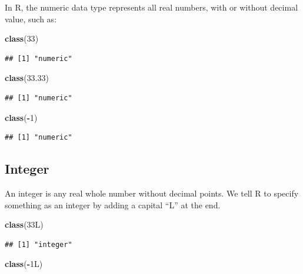 \documentclass[
]{book}
\newenvironment{Shaded}{\begin{snugshade}}{\end{snugshade}}
\newcommand{\DecValTok}[1]{\textcolor[rgb]{0.00,0.00,0.81}{#1}}
\newcommand{\FloatTok}[1]{\textcolor[rgb]{0.00,0.00,0.81}{#1}}
\newcommand{\FunctionTok}[1]{\textcolor[rgb]{0.13,0.29,0.53}{\textbf{#1}}}
\newcommand{\NormalTok}[1]{#1}
\newcommand{\SpecialCharTok}[1]{\textcolor[rgb]{0.81,0.36,0.00}{\textbf{#1}}}
\begin{document}
In R, the numeric data type represents all real numbers, with or without decimal value, such as:

\begin{Shaded}
\begin{Highlighting}[]
\FunctionTok{class}\NormalTok{(}\DecValTok{33}\NormalTok{)}
\end{Highlighting}
\end{Shaded}

\begin{verbatim}
## [1] "numeric"
\end{verbatim}

\begin{Shaded}
\begin{Highlighting}[]
\FunctionTok{class}\NormalTok{(}\FloatTok{33.33}\NormalTok{)}
\end{Highlighting}
\end{Shaded}

\begin{verbatim}
## [1] "numeric"
\end{verbatim}

\begin{Shaded}
\begin{Highlighting}[]
\FunctionTok{class}\NormalTok{(}\SpecialCharTok{{-}}\DecValTok{1}\NormalTok{)}
\end{Highlighting}
\end{Shaded}

\begin{verbatim}
## [1] "numeric"
\end{verbatim}

\hypertarget{integer}{%
\subsection{Integer}\label{integer}}

An integer is any real whole number without decimal points. We tell R to specify something as an integer by adding a capital ``L'' at the end.

\begin{Shaded}
\begin{Highlighting}[]
\FunctionTok{class}\NormalTok{(33L)}
\end{Highlighting}
\end{Shaded}

\begin{verbatim}
## [1] "integer"
\end{verbatim}

\begin{Shaded}
\begin{Highlighting}[]
\FunctionTok{class}\NormalTok{(}\SpecialCharTok{{-}}\NormalTok{1L)}
\end{Highlighting}
\end{Shaded}
\end{document}
